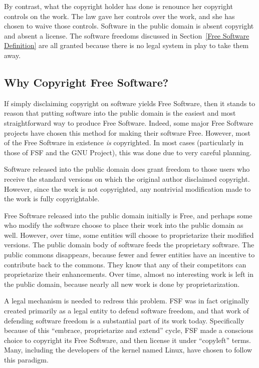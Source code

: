 \documentclass[11pt, letterpaper]{book}
\begin{document}
By contrast, what the copyright holder has done is renounce her copyright
controls on the work. The law gave her controls over the work, and she
has chosen to waive those controls. Software in the public domain is
absent copyright and absent a license. The software freedoms discussed in
Section~\ref{Free Software Definition} are all granted because there is no
legal system in play to take them away.

\subsection{Why Copyright Free Software?}

If simply disclaiming copyright on software yields Free Software, then it
stands to reason that putting software into the public domain is the
easiest and most straightforward way to produce Free Software. Indeed,
some major Free Software projects have chosen this method for making their
software Free. However, most of the Free Software in existence \emph{is}
copyrighted. In most cases (particularly in those of FSF and the GNU
Project), this was done due to very careful planning.

Software released into the public domain does grant freedom to those users
who receive the standard versions on which the original author disclaimed
copyright. However, since the work is not copyrighted, any nontrivial
modification made to the work is fully copyrightable.

Free Software released into the public domain initially is Free, and
perhaps some who modify the software choose to place their work into the
public domain as well. However, over time, some entities will choose to
proprietarize their modified versions. The public domain body of software
feeds the proprietary software. The public commons disappears, because
fewer and fewer entities have an incentive to contribute back to the
commons. They know that any of their competitors can proprietarize their
enhancements. Over time, almost no interesting work is left in the public
domain, because nearly all new work is done by proprietarization.

A legal mechanism is needed to redress this problem. FSF was in fact
originally created primarily as a legal entity to defend software freedom,
and that work of defending software freedom is a substantial part of
its work today. Specifically because of this ``embrace, proprietarize and
extend'' cycle, FSF made a conscious choice to copyright its Free Software,
and then license it under ``copyleft'' terms. Many, including the
developers of the kernel named Linux, have chosen to follow this paradigm.
\end{document}
